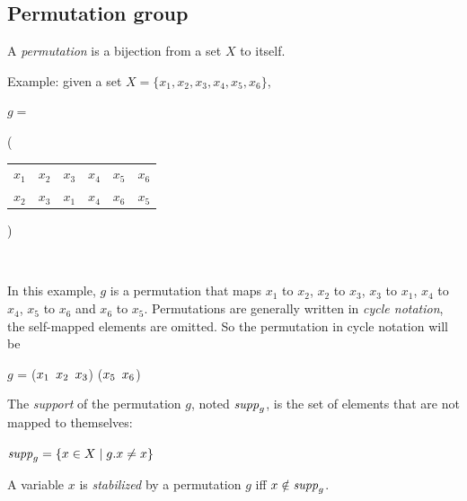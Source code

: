 \subsection{Permutation group}
\begin{definition}[Permutation]
 A \emph{permutation} is a bijection from a set $X$ to itself.
\end{definition}
Example: given a set $X = \{x_1, x_2, x_3, x_4, x_5, x_6\}$,
\begin{center}
$g = ${\Bigg( \begin{tabular}{cccccc}
  $x_1$ & $x_2$ & $x_3$ & $x_4$ & $x_5$ & $x_6$\\
  $x_2$ & $x_3$ & $x_1$ & $x_4$ & $x_6$ & $x_5$
 \end{tabular} \Bigg)}\\
\end{center}
In this example, $g$ is a permutation that maps $x_1$ to $x_2$, $x_2$ to $x_3$, $x_3$ to $x_1$, $x_4$ to $x_4$, $x_5$ to $x_6$ and $x_6$ to $x_5$.
Permutations are generally written in \emph{cycle notation}, the self-mapped elements are omitted.
So the permutation in cycle notation will be 
\begin{center}
 $g$ = ($x_1 \enskip x_2 \enskip x_3$) ($x_5 \enskip x_6$)
\end{center}
\begin{definition}
 The \emph{support} of the permutation $g$, noted $\mathit{supp}_{g}$, is the set of elements that are not mapped to themselves:
 \begin{center}
  $\mathit{supp}_{g} = \{ x \in X \mid g.x \neq x\}$
 \end{center}
\end{definition}

\begin{definition}
 A variable $x$ is \emph{stabilized} by a permutation $g$  iff $x \notin \mathit{supp}_g$.
\end{definition}
 
